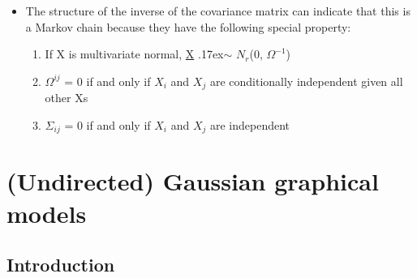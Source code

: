 \documentclass[12pt]{report}
\begin{document}
\begin{itemize}
\item The structure of the inverse of the covariance matrix can indicate that this is a Markov chain because they have the following special property:

\bigskip
\begin{enumerate}

\item If X is multivariate normal, \underline{X} {\raise.17ex\hbox{$\scriptstyle\sim$}} $N_{r}$(0, $\Omega^{-1}$)

\item $\Omega^{ij}$ = 0 if and only if $X_{i}$ and $X_{j}$ are conditionally independent given all other Xs

\item $\Sigma_{ij}$ = 0 if and only if $X_{i}$ and $X_{j}$ are independent

\end{enumerate}

\end{itemize}

\section{(Undirected) Gaussian graphical models}

\subsection{Introduction}
\end{document}
